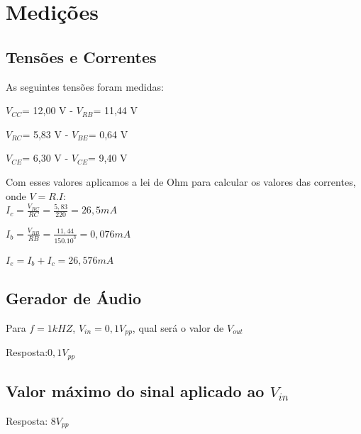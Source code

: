 \section[Medições]{Medições}

\subsection{Tensões e Correntes}

As seguintes tensões foram medidas:

\par  $V_{CC}$= 12,00 V - $V_{RB}$= 11,44 V
\par  $V_{RC}$=  5,83 V - $V_{BE}$=  0,64 V 
\par  $V_{CE}$=  6,30 V - $V_{CE}$=  9,40 V 


Com esses valores aplicamos a lei de Ohm para calcular os valores das correntes, onde $V = R.I$:\\

$I_c=\frac{V_{RC}}{RC} = \frac{5,83}{220} = 26,5 mA$


$I_b=\frac{V_{RB}}{RB} = \frac{11,44}{150.10^3} = 0,076 mA$


$I_e= I_b + I_c = 26,576 mA$


\subsection[Gerador de Áudio]{Gerador de Áudio}

Para $f=1kHZ$, $V_{in}=0,1V_{pp}$, qual será o valor de $V_{out}$


Resposta:$0,1  V_{pp}$
\subsection{Valor máximo do sinal aplicado ao $V_{in}$}
Resposta: $8  V_{pp}$


% 
% 
